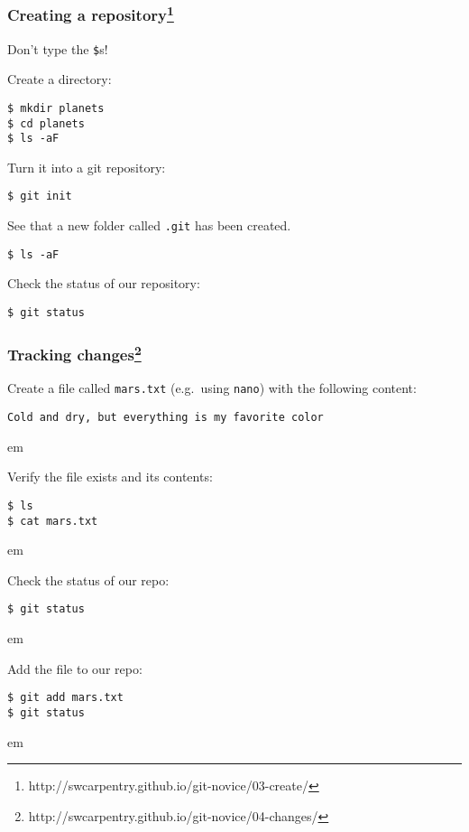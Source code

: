 \documentclass{beamer}
\begin{document}
\begin{frame}[fragile]
\frametitle{Creating a repository\footnote{http://swcarpentry.github.io/git-novice/03-create/}}

\textcolor{red!50!black}{Don't type the \texttt{\$}s!}

Create a directory:
\begin{verbatim}
$ mkdir planets
$ cd planets
$ ls -aF
\end{verbatim}

\pause
Turn it into a git repository:
\begin{verbatim}
$ git init
\end{verbatim}
\pause

See that a new folder called \texttt{.git} has been created.
\begin{verbatim}
$ ls -aF
\end{verbatim}
\pause

Check the status of our repository:
\begin{verbatim}
$ git status
\end{verbatim}

\end{frame}

\begin{frame}[fragile]
  \frametitle{Tracking changes\footnote{http://swcarpentry.github.io/git-novice/04-changes/}}

  Create a file called \texttt{mars.txt} (e.g.~using \texttt{nano}) with the following content:

\begin{verbatim}
Cold and dry, but everything is my favorite color
\end{verbatim}

  \pause

 em

Verify the file exists and its contents:

\begin{verbatim}
$ ls
$ cat mars.txt
\end{verbatim}

\pause

 em

Check the status of our repo:
\begin{verbatim}
$ git status
\end{verbatim}

 em
\pause

Add the file to our repo:
\begin{verbatim}
$ git add mars.txt
$ git status
\end{verbatim}

 em
\pause


\end{frame}
\end{document}
